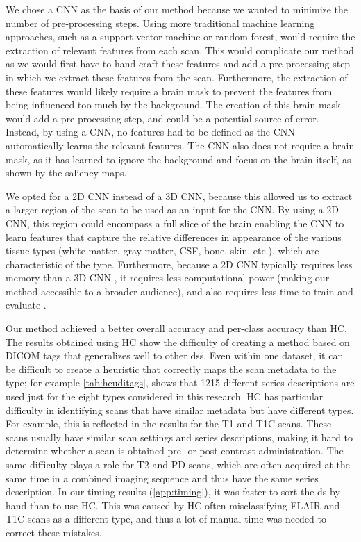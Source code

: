 We chose a \gls{CNN} as the basis of our method because we wanted to minimize the number of pre-processing steps.
Using more traditional machine learning approaches, such as a support vector machine or random forest, would require the extraction of relevant features from each \gls{scan}.
This would complicate our method as we would first have to hand-craft these features and add a pre-processing step in which we extract these features from the \gls{scan}.
Furthermore, the extraction of these features would likely require a brain mask to prevent the features from being influenced too much by the background.
The creation of this brain mask would add a pre-processing step, and could be a potential source of error.
Instead, by using a \gls{CNN}, no features had to be defined as the \gls{CNN} automatically learns the relevant features.
The \gls{CNN} also does not require a brain mask, as it has learned to ignore the background and focus on the brain itself, as shown by the saliency maps.

We opted for a 2D \gls{CNN} instead of a 3D \gls{CNN}, because this allowed us to extract a larger region of the \gls{scan} to be used as an input for the \gls{CNN}.
By using a 2D \gls{CNN}, this region could encompass a full slice of the brain enabling the \gls{CNN} to learn features that capture the relative differences in appearance of the various tissue types (white matter, gray matter, CSF, bone, skin, etc.), which are characteristic of the \gls{type}.
Furthermore, because a 2D \gls{CNN} typically requires less memory than a 3D \gls{CNN} \autocite{prasoon2013deep}, it requires less computational power (making our method accessible to a broader audience), and also requires less time to train and evaluate \autocite{rongjian2014deep}.

Our method achieved a better overall accuracy and per-class accuracy than \gls{HC}.
The results obtained using \gls{HC} show the difficulty of creating a method based on \gls{DICOM} tags that generalizes well to other \glspl{ds}.
Even within one dataset, it can be difficult to create a heuristic that correctly maps the \gls{scan} metadata to the \gls{type}; for example \cref{tab:heuditags}, shows that 1215 different series descriptions are used just for the eight \glspl{type} considered in this research.
\gls{HC} has particular difficulty in identifying \glspl{scan} that have similar metadata but have different \glspl{type}.
For example, this is reflected in the results for the \gls{T1} and \gls{T1C} \glspl{scan}.
These \glspl{scan} usually have similar scan settings and series descriptions, making it hard to determine whether a \gls{scan} is obtained pre- or post-contrast administration.
The same difficulty plays a role for \gls{T2} and \gls{PD} \glspl{scan}, which are often acquired at the same time in a combined imaging sequence and thus have the same series description.
In our timing results (\cref{app:timing}), it was faster to sort the \gls{ds} by hand than to use \gls{HC}.
This was caused by \gls{HC} often misclassifying \gls{FLAIR} and \gls{T1C} \glspl{scan} as a different \gls{type}, and thus a lot of manual time was needed to correct these mistakes.

